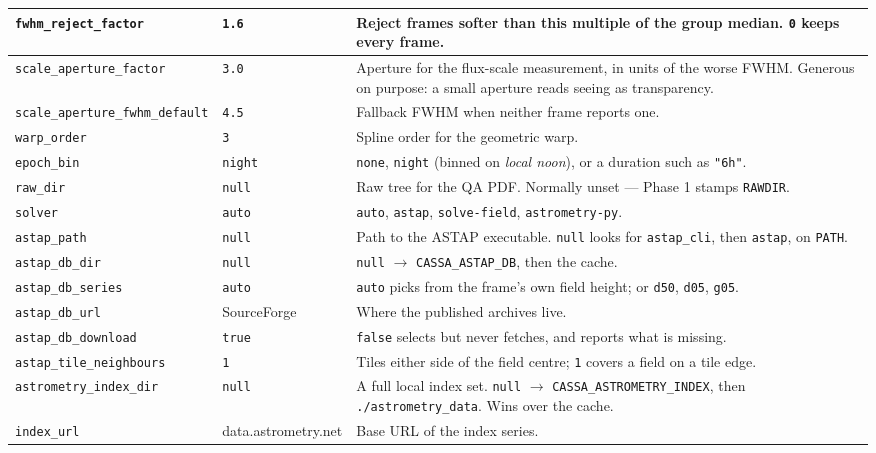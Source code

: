 \documentclass[11pt,a4paper]{article}
\begin{document}
\begin{center}
\begin{longtable}{|p{4.6cm}|p{1.9cm}|p{8.0cm}|}
\hline
\texttt{fwhm\_reject\_factor} & \texttt{1.6} & Reject frames softer than this multiple of the group median. \texttt{0} keeps every frame. \\
\hline
\texttt{scale\_aperture\_factor} & \texttt{3.0} & Aperture for the flux-scale measurement, in units of the worse FWHM. Generous on purpose: a small aperture reads seeing as transparency. \\
\hline
\texttt{scale\_aperture\_fwhm\_default} & \texttt{4.5} & Fallback FWHM when neither frame reports one. \\
\hline
\texttt{warp\_order} & \texttt{3} & Spline order for the geometric warp. \\
\hline
\texttt{epoch\_bin} & \texttt{night} & \texttt{none}, \texttt{night} (binned on \emph{local noon}), or a duration such as \texttt{"6h"}. \\
\hline
\texttt{raw\_dir} & \texttt{null} & Raw tree for the QA PDF. Normally unset --- Phase 1 stamps \texttt{RAWDIR}. \\
\hline
\texttt{solver} & \texttt{auto} & \texttt{auto}, \texttt{astap}, \texttt{solve-field}, \texttt{astrometry-py}. \\
\hline
\texttt{astap\_path} & \texttt{null} & Path to the ASTAP executable. \texttt{null} looks for \texttt{astap\_cli}, then \texttt{astap}, on \texttt{PATH}. \\
\hline
\texttt{astap\_db\_dir} & \texttt{null} & \texttt{null} $\rightarrow$ \texttt{CASSA\_ASTAP\_DB}, then the cache. \\
\hline
\texttt{astap\_db\_series} & \texttt{auto} & \texttt{auto} picks from the frame's own field height; or \texttt{d50}, \texttt{d05}, \texttt{g05}. \\
\hline
\texttt{astap\_db\_url} & SourceForge & Where the published archives live. \\
\hline
\texttt{astap\_db\_download} & \texttt{true} & \texttt{false} selects but never fetches, and reports what is missing. \\
\hline
\texttt{astap\_tile\_neighbours} & \texttt{1} & Tiles either side of the field centre; \texttt{1} covers a field on a tile edge. \\
\hline
\texttt{astrometry\_index\_dir} & \texttt{null} & A full local index set. \texttt{null} $\rightarrow$ \texttt{CASSA\_ASTROMETRY\_INDEX}, then \texttt{./astrometry\_data}. Wins over the cache. \\
\hline
\texttt{index\_url} & data.astrometry.net & Base URL of the index series. \\

\end{longtable}
\end{center}
\end{document}
